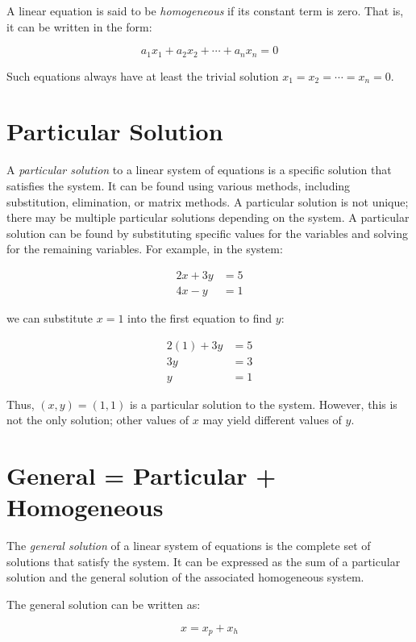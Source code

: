 A linear equation is said to be \emph{homogeneous} if its constant term is zero. That is, it
can be written in the form:

\[
    a_1 x_1 + a_2 x_2 + \cdots + a_n x_n = 0
\]

Such equations always have at least the trivial solution \(x_1 = x_2 = \cdots = x_n = 0\).

\section{Particular Solution}

A \emph{particular solution} to a linear system of equations is a specific solution that satisfies the system. It can be found using various methods, 
including substitution, elimination, or matrix methods. A particular solution is not unique; there may be multiple particular solutions depending on the 
system. A particular solution can be found by substituting specific values for the variables and solving for the remaining variables. For example, in 
the system:

\begin{align*}
    2x + 3y & = 5 \\
    4x - y  & = 1
\end{align*}

we can substitute \(x = 1\) into the first equation to find \(y\):

\begin{align*}
    2(1) + 3y & = 5 \\
    3y        & = 3 \\
    y         & = 1
\end{align*}

Thus, \((x, y) = (1, 1)\) is a particular solution to the system. However, this is not the only solution;
other values of \(x\) may yield different values of \(y\).

\section{General = Particular + Homogeneous}

The \emph{general solution} of a linear system of equations is the complete set of solutions that satisfy the
system. It can be expressed as the sum of a particular solution and the general solution of the associated
homogeneous system.

The general solution can be written as:

\[
    x = x_p + x_h
\]

